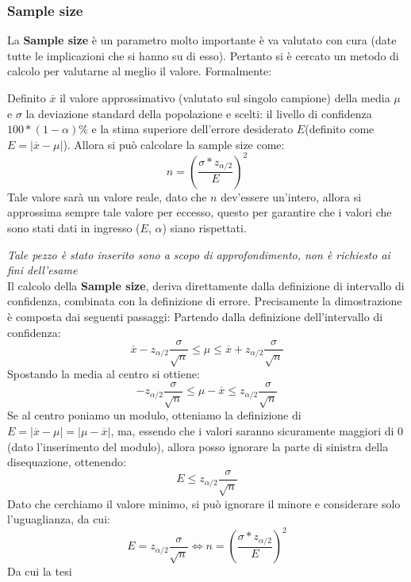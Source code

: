 \subsubsection{Sample size}
La \textbf{Sample size} è un parametro molto importante è va valutato con cura (date tutte le implicazioni che si hanno su di esso). Pertanto si è cercato un metodo di calcolo per valutarne al meglio il valore. 
Formalmente:

Definito \(\overline{x}\) il valore approssimativo (valutato sul singolo campione) della media \(\mu\) e \(\sigma\) la deviazione standard della popolazione e scelti: il livello di confidenza \(100*(1-\alpha)\%\) e la stima superiore dell'errore desiderato \(E\)(definito come \(E=|\overline{x} - \mu|\)). Allora si può calcolare la sample size come:
\[
n = \left ( \frac{\sigma * z_{\alpha/2}}{E} \right )^2
\]
Tale valore sarà un valore reale, dato che \(n\) dev'essere un'intero, allora si approssima sempre tale valore per eccesso, questo per garantire che i valori che sono stati dati in ingresso (\(E\), \(\alpha\)) siano rispettati.

\begin{info}
\textit{Tale pezzo è stato inserito sono a scopo di approfondimento, non è richiesto ai fini dell'esame}
\\
Il calcolo della \textbf{Sample size}, deriva direttamente dalla definizione di intervallo di confidenza, combinata con la definizione di errore. Precisamente la dimostrazione è composta dai seguenti passaggi:
Partendo dalla definizione dell'intervallo di confidenza:
\[
\overline{x} - z_{\alpha/2}\frac{\sigma}{\sqrt{n}} \leq \mu \leq \overline{x} + z_{\alpha/2}\frac{\sigma}{\sqrt{n}}
\]
Spostando la media al centro si ottiene:
\[
- z_{\alpha/2}\frac{\sigma}{\sqrt{n}} \leq \mu - \overline{x} \leq z_{\alpha/2}\frac{\sigma}{\sqrt{n}}
\]
Se al centro poniamo un modulo, otteniamo la definizione di \(E = |\overline{x} - \mu| = |\mu - \overline{x}|\), ma, essendo che i valori saranno sicuramente maggiori di 0 (dato l'inserimento del modulo), allora posso ignorare la parte di sinistra della disequazione, ottenendo:
\[
E \leq z_{\alpha/2}\frac{\sigma}{\sqrt{n}}
\]
Dato che cerchiamo il valore minimo, si può ignorare il minore e considerare solo l'uguaglianza, da cui:
\[
E = z_{\alpha/2}\frac{\sigma}{\sqrt{n}} \iff n = \left ( \frac{\sigma * z_{\alpha/2}}{E} \right )^2
\]
Da cui la tesi
\end{info}

